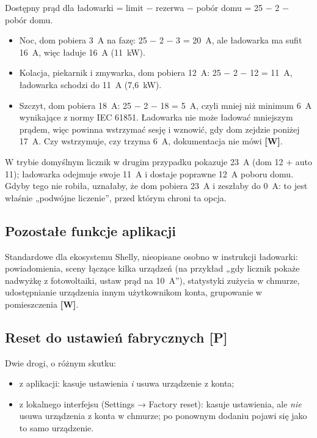 \documentclass[11pt,a4paper]{article}
\newcommand{\tagP}{\textcolor{apgreen}{\textbf{[P]}}}
\newcommand{\tagW}{\textcolor{apamber}{\textbf{[W]}}}
\begin{document}
\begin{przyklad}
Dostępny prąd dla ładowarki = limit − rezerwa − pobór domu = 25 − 2 − pobór domu.
\begin{itemize}
\item Noc, dom pobiera 3~A na fazę: 25 − 2 − 3 = 20~A, ale ładowarka ma sufit 16~A, więc ładuje 16~A (11~kW).
\item Kolacja, piekarnik i zmywarka, dom pobiera 12~A: 25 − 2 − 12 = 11~A, ładowarka schodzi do 11~A (7,6~kW).
\item Szczyt, dom pobiera 18~A: 25 − 2 − 18 = 5~A, czyli mniej niż minimum 6~A wynikające z normy IEC 61851. Ładowarka nie może ładować mniejszym prądem, więc powinna wstrzymać sesję i wznowić, gdy dom zejdzie poniżej 17~A. Czy wstrzymuje, czy trzyma 6~A, dokumentacja nie mówi \tagW.
\end{itemize}
W trybie domyślnym licznik w drugim przypadku pokazuje 23~A (dom 12 + auto 11); ładowarka odejmuje swoje 11~A i dostaje poprawne 12~A poboru domu. Gdyby tego nie robiła, uznałaby, że dom pobiera 23~A i zeszłaby do 0~A: to jest właśnie „podwójne liczenie”, przed którym chroni ta opcja.
\end{przyklad}

\subsection{Pozostałe funkcje aplikacji}

Standardowe dla ekosystemu Shelly, nieopisane osobno w instrukcji ładowarki: powiadomienia, sceny łączące kilka urządzeń (na przykład „gdy licznik pokaże nadwyżkę z fotowoltaiki, ustaw prąd na 10~A”), statystyki zużycia w chmurze, udostępnianie urządzenia innym użytkownikom konta, grupowanie w pomieszczenia \tagW.

\subsection{Reset do ustawień fabrycznych \tagP}

Dwie drogi, o różnym skutku:
\begin{itemize}
\item z aplikacji: kasuje ustawienia \emph{i} usuwa urządzenie z konta;
\item z lokalnego interfejsu (Settings → Factory reset): kasuje ustawienia, ale \emph{nie} usuwa urządzenia z konta w chmurze; po ponownym dodaniu pojawi się jako to samo urządzenie.
\end{itemize}
\end{document}
